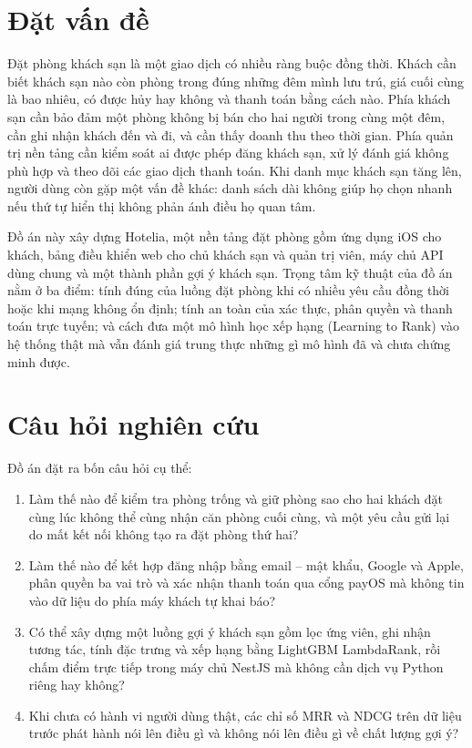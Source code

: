 
\section*{Đặt vấn đề}

Đặt phòng khách sạn là một giao dịch có nhiều ràng buộc đồng thời. Khách cần biết khách sạn nào còn phòng trong đúng những đêm mình lưu trú, giá cuối cùng là bao nhiêu, có được hủy hay không và thanh toán bằng cách nào. Phía khách sạn cần bảo đảm một phòng không bị bán cho hai người trong cùng một đêm, cần ghi nhận khách đến và đi, và cần thấy doanh thu theo thời gian. Phía quản trị nền tảng cần kiểm soát ai được phép đăng khách sạn, xử lý đánh giá không phù hợp và theo dõi các giao dịch thanh toán. Khi danh mục khách sạn tăng lên, người dùng còn gặp một vấn đề khác: danh sách dài không giúp họ chọn nhanh nếu thứ tự hiển thị không phản ánh điều họ quan tâm.

Đồ án này xây dựng Hotelia, một nền tảng đặt phòng gồm ứng dụng iOS cho khách, bảng điều khiển web cho chủ khách sạn và quản trị viên, máy chủ API dùng chung và một thành phần gợi ý khách sạn. Trọng tâm kỹ thuật của đồ án nằm ở ba điểm: tính đúng của luồng đặt phòng khi có nhiều yêu cầu đồng thời hoặc khi mạng không ổn định; tính an toàn của xác thực, phân quyền và thanh toán trực tuyến; và cách đưa một mô hình học xếp hạng (Learning to Rank) vào hệ thống thật mà vẫn đánh giá trung thực những gì mô hình đã và chưa chứng minh được.

\section*{Câu hỏi nghiên cứu}

Đồ án đặt ra bốn câu hỏi cụ thể:

\begin{enumerate}[label=Q\arabic*., leftmargin=1.4cm]
\item Làm thế nào để kiểm tra phòng trống và giữ phòng sao cho hai khách đặt cùng lúc không thể cùng nhận căn phòng cuối cùng, và một yêu cầu gửi lại do mất kết nối không tạo ra đặt phòng thứ hai?
\item Làm thế nào để kết hợp đăng nhập bằng email -- mật khẩu, Google và Apple, phân quyền ba vai trò và xác nhận thanh toán qua cổng payOS mà không tin vào dữ liệu do phía máy khách tự khai báo?
\item Có thể xây dựng một luồng gợi ý khách sạn gồm lọc ứng viên, ghi nhận tương tác, tính đặc trưng và xếp hạng bằng LightGBM LambdaRank, rồi chấm điểm trực tiếp trong máy chủ NestJS mà không cần dịch vụ Python riêng hay không?
\item Khi chưa có hành vi người dùng thật, các chỉ số MRR và NDCG trên dữ liệu trước phát hành nói lên điều gì và không nói lên điều gì về chất lượng gợi ý?
\end{enumerate}

